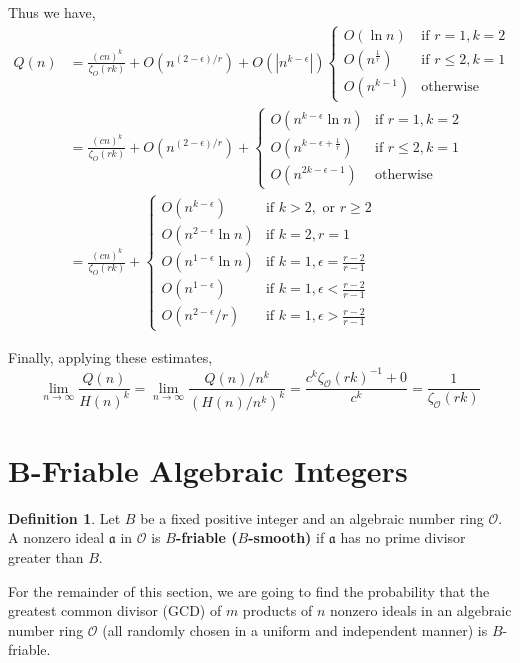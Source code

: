 \documentclass[10pt,a4paper]{article}
\theoremstyle{definition}
\newtheorem{definition}{Definition}[section]
\theoremstyle{remark}
\begin{document}
	Thus we have, 
	\begin{align}
		Q(n)&=\frac{(cn)^k}{\zeta_{O}(rk)}+O(n^{(2-\epsilon)/r}) +O(|n^{k-\epsilon}|) \begin{cases}
			O(\ln n) & \text{if } r=1, k=2 \\
			O(n^\frac{1}{r}) & \text{if } r\leq2, k=1 \\
			O(n^{k-1}) & \text{otherwise}
		\end{cases}\\
		&=\frac{(cn)^k}{\zeta_{O}(rk)}+O(n^{(2-\epsilon)/r}) + \begin{cases}
			O(n^{k-\epsilon}\ln n) & \text{if  } r=1, k=2 \\
			O(n^{k-\epsilon+\frac{1}{r}}) & \text{if } r\leq2, k=1 \\
			O(n^{2k-\epsilon-1}) & \text{otherwise}
		\end{cases}\\ 
	&=\frac{(cn)^k}{\zeta_{O}(rk)} + \begin{cases}
		O(n^{k-\epsilon}) & \text{if  } k>2, \text{ or } r \geq 2\\
		O(n^{2-\epsilon} \ln n) & \text{if  } k=2, r=1 \\
		O(n^{1-\epsilon} \ln n) & \text{if } k=1, \epsilon=\frac{r-2}{r-1} \\
		O(n^{1-\epsilon}) & \text{if } k=1, \epsilon< \frac{r-2}{r-1}\\
		O(n^{2-\epsilon}/r) & \text{if } k=1, \epsilon > \frac{r-2}{r-1}
	\end{cases}
	\end{align}

	Finally, applying these estimates, 
	\begin{equation}
		\lim\limits_{n\to\infty} \frac{Q(n)}{H(n)^k} = \lim\limits_{n\to\infty} \frac{Q(n)/n^k}{(H(n)/n^k)^k}=\frac{c^k\zeta_\mathcal{O}(rk)^{-1}+0}{c^k}=\frac{1}{\zeta_\mathcal{O}(rk)}
	\end{equation}

\section{B-Friable Algebraic Integers}

\begin{definition} Let $B$ be a fixed positive integer and an algebraic number ring $\mathcal{O}$. A nonzero ideal $\mathfrak{a}$ in $\mathcal{O}$ is \textbf{$B$-friable ($B$-smooth)} if $\mathfrak{a}$ has no prime divisor greater than $B$. 
\end{definition}
For the remainder of this section, we are going to find the probability that the greatest common divisor (GCD) of $m$ products of $n$ nonzero ideals in an algebraic number ring $\mathcal{O}$ (all randomly chosen in a uniform and independent manner) is $B$-friable.
\end{document}
